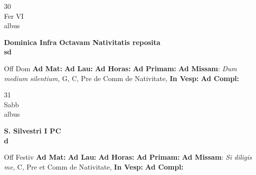 \documentclass[10pt, openany]{book}
\begin{document}
    \begin{center}
        \begin{minipage}{3.5in}
            \vspace{2em}
            \begin{minipage}{0.5in}
                {\Huge 30} \\
                {\normalsize Fer VI} \\
                {\normalsize albus}
            \end{minipage}
            \begin{minipage}{3.0in}
                \textbf{ \large Dominica Infra Octavam Nativitatis reposita \\
                \textnormal{\normalsize sd}} \\ 
            \end{minipage}
            \begin{justify}Off Dom
                \textbf{Ad Mat: }
                \textbf{Ad Lau: }
                \textbf{Ad Horas: }
                \textbf{Ad Primam: }\textbf{Ad Missam}: \textit{Dum medium silentium,} G, C, Pre de Comm de Nativitate,  
                \textbf{In Vesp: }
                \textbf{Ad Compl: }
            \end{justify}
        \end{minipage}
    \end{center}

    \begin{center}
        \begin{minipage}{3.5in}
            \vspace{2em}
            \begin{minipage}{0.5in}
                {\Huge 31} \\
                {\normalsize Sabb} \\
                {\normalsize albus}
            \end{minipage}
            \begin{minipage}{3.0in}
                \textbf{ \large S. Silvestri I PC \\
                \textnormal{\normalsize d}} \\ 
            \end{minipage}
            \begin{justify}Off Festiv
                \textbf{Ad Mat: }
                \textbf{Ad Lau: }
                \textbf{Ad Horas: }
                \textbf{Ad Primam: }\textbf{Ad Missam}: \textit{Si diligis me,} C, Pre et Comm de Nativitate,  
                \textbf{In Vesp: }
                \textbf{Ad Compl: }
            \end{justify}
        \end{minipage}
    \end{center}
\end{document}
